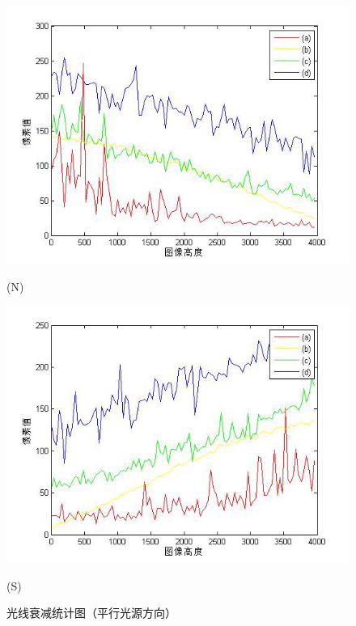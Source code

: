 \begin{figure}[htbp]
\begin{minipage}{0.48\linewidth}
\centerline{\includegraphics[width=1\linewidth]{figures/guangxianshuaijianduibituchuzhin.png}}
\centerline{(N)}
\end{minipage}
\begin{minipage}{0.48\linewidth}
\centerline{\includegraphics[width=1\linewidth]{figures/guangxianshuaijianduibituchuzhis.png}}
\centerline{(S)}
\end{minipage}

\caption{光线衰减统计图（平行光源方向）}
\label{fig:guangxiansunshipingxing}
\vspace{-3mm}
\end{figure}



